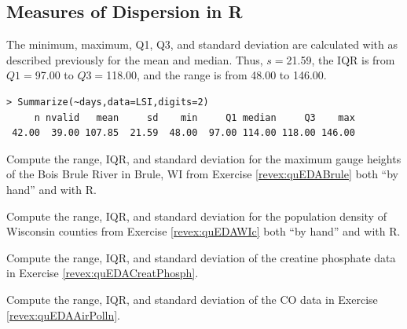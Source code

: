 \documentclass[10pt,openany]{book}\usepackage[]{graphicx}\usepackage[]{color}
\makeatletter
\newenvironment{kframe}{%
 \def\at@end@of@kframe{}%
 \ifinner\ifhmode%
  \def\at@end@of@kframe{\end{minipage}}%
  \begin{minipage}{\columnwidth}%
 \fi\fi%
 \def\FrameCommand##1{\hskip\@totalleftmargin \hskip-\fboxsep
 \colorbox{shadecolor}{##1}\hskip-\fboxsep
     \hskip-\linewidth \hskip-\@totalleftmargin \hskip\columnwidth}%
 \MakeFramed {\advance\hsize-\width
   \@totalleftmargin\z@ \linewidth\hsize
   \@setminipage}}%
 {\par\unskip\endMakeFramed%
 \at@end@of@kframe}
\newenvironment{knitrout}{}{} %
\makeatother
\begin{document}
\vspace{-6pt}
\subsection{Measures of Dispersion in R} \label{sect:DescStatsDispersion}
\vspace{-10pt}
The minimum, maximum, Q1, Q3, and standard deviation are calculated with  as described previously for the mean and median. Thus, $s=$21.59, the IQR is from $Q1=$97.00 to $Q3=$118.00, and the range is from 48.00 to 146.00.
\begin{knitrout}
\color{fgcolor}\begin{kframe}
\begin{verbatim}
> Summarize(~days,data=LSI,digits=2)
     n nvalid   mean     sd    min     Q1 median     Q3    max 
 42.00  39.00 107.85  21.59  48.00  97.00 114.00 118.00 146.00 
\end{verbatim}
\end{kframe}
\end{knitrout}

\vspace{-8pt}
\begin{exsection}
  \item \label{revex:quEDABruleDisp} \rhw{} Compute the range, IQR, and standard deviation for the maximum gauge heights of the Bois Brule River in Brule, WI from Exercise \ref{revex:quEDABrule} both ``by hand'' and with R. 

  \item \label{revex:quEDAWIDisp} \rhw{} Compute the range, IQR, and standard deviation for the population density of Wisconsin counties from Exercise \ref{revex:quEDAWIc} both ``by hand'' and with R. 

  \item \label{revex:quEDACreatPhosph3} \rhw{} Compute the range, IQR, and standard deviation of the creatine phosphate data in Exercise \ref{revex:quEDACreatPhosph}. 

  \item \label{revex:quEDAAirPolln3} \rhw{} \hspace{12pt} Compute the range, IQR, and standard deviation of the CO data in Exercise \ref{revex:quEDAAirPolln}. 
\end{exsection}
\end{document}
